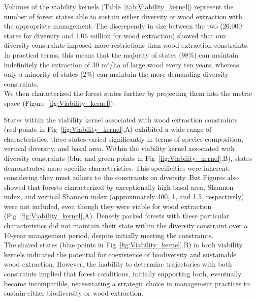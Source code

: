 \documentclass{article}
\begin{document}
Volumes of the viability kernels (Table~\ref{tab:Viability_kernel}) represent the number of forest states able to sustain either diversity or wood extraction with the appropriate management. The discrependy in size between the two (26,000 states for diversity and 1.06 million for wood extraction) showed that our diversity constraints imposed more restrictions than wood extraction constraints. In practical terms, this means that the majority of states (98\%) can maintain indefinitely the extraction of 30 m³/ha of large wood every ten years, whereas only a minority of states (2\%) can maintain the more demanding diversity constraints. \\
We then characterized the forest states further by projecting them into the metric space (Figure~\ref{fig:Viability_kernel}).

States within the viability kernel associated with wood extraction constraints (red points in Fig~\ref{fig:Viability_kernel},A) exhibited a wide range of characteristics, these states varied significantly in terms of species composition, vertical diversity, and basal area. Within the viability kernel associated with diversity constraints (blue and green points in Fig~\ref{fig:Viability_kernel},B), states demonstrated more specific characteristics. This specificities were inherent, considering they must adhere to the constraints on diversity. But Figures also showed that forests characterized by exceptionally high basal area, Shannon index, and vertical Shannon index (approximately 400, 1, and 1.5, respectively) were not included, even though they were viable for wood extraction (Fig~\ref{fig:Viability_kernel},A). Densely packed forests with these particular characteristics did not maintain their state within the diversity constraint over a 10-year management period, despite initially meeting the constraints.\\
The shared states (blue points in Fig~\ref{fig:Viability_kernel},B) in both viability kernels indicated the potential for coexistence of biodiversity and sustainable wood extraction. However, the inability to determine trajectories with both constraints implied that forest conditions, initially supporting both, eventually became incompatible, necessitating a strategic choice in management practices to sustain either biodiversity or wood extraction.
\end{document}
